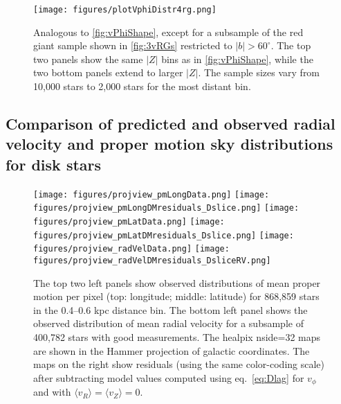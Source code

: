 \begin{figure}[!ht]
\texttt{[image: figures/plotVphiDistr4rg.png]}
\caption{Analogous to \autoref{fig:vPhiShape}, except for a subsample of the red giant sample shown in \autoref{fig:3vRGs} restricted to $|b|>60^\circ$.
  The top two panels show the same $|Z|$ bins as in \autoref{fig:vPhiShape}, while the two bottom panels extend to larger $|Z|$. 
  The sample sizes vary from 10,000 stars to 2,000 stars for the most distant bin.} 
\label{fig:vPhiShapeRG} 
\end{figure}



\subsection{Comparison of predicted and observed radial velocity and proper motion sky distributions for disk stars\label{sec:allsky}}


\begin{figure}[!ht]
\texttt{[image: figures/projview\_pmLongData.png]}
\texttt{[image: figures/projview\_pmLongDMresiduals\_Dslice.png]}
\texttt{[image: figures/projview\_pmLatData.png]}
\texttt{[image: figures/projview\_pmLatDMresiduals\_Dslice.png]}
\texttt{[image: figures/projview\_radVelData.png]}
\texttt{[image: figures/projview\_radVelDMresiduals\_DsliceRV.png]}
\caption{The top two left panels show observed distributions of mean proper motion per pixel (top: longitude; middle: latitude)
for 868,859 stars in the 0.4--0.6 kpc distance bin. The bottom left panel shows the observed distribution of mean radial velocity
for a subsample of 400,782 stars with good measurements. The healpix nside=32 maps are shown in the Hammer
projection of galactic coordinates. The maps on the right show residuals (using the same color-coding scale) after
subtracting model values computed using eq.~\ref{eq:Dlag} for $v_\phi$ and with $\langle v_R \rangle = \langle v_Z \rangle = 0$.} 
\label{fig:skyComparison} 
\end{figure}


